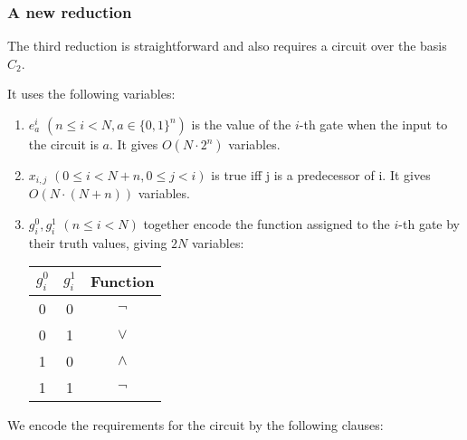 \documentclass{article}
\begin{document}
\subsubsection{A new reduction}

The third reduction is straightforward and also requires a circuit over the basis \(C_2\).

It uses the following variables:

\begin{enumerate}
  \item \(e^i_a\) \((n \leq i < N, a\in\{0,1\}^n)\) is the value of the \(i\)-th gate when the input to the circuit is \(a\). It gives \(O(N\cdot 2^n)\) variables.
  \item \(x_{i,j}\) \(( 0 \leq i < N+n,0 \leq j < i)\) is true iff j is a predecessor of i. It gives \(O(N\cdot (N+n))\) variables.
  \item \(g^0_i, g^1_i\) \((n \leq i < N)\) together encode the function assigned to the \(i\)-th gate by their truth values, giving \(2N\) variables:

    \begin{center}
    \begin{tabular}{ |c|c|c| }
    \hline
    \(g^0_i\) & \(g^1_i\) & Function \\ 
    \hline
    0 & 0 & \(\neg\) \\  
    0 & 1 & \(\lor\) \\ 
    1 & 0 & \(\land\) \\ 
    1 & 1 & \(\neg\) \\   
    \hline
    \end{tabular}
    \end{center}

\end{enumerate}

We encode the requirements for the circuit by the following clauses:
\end{document}
